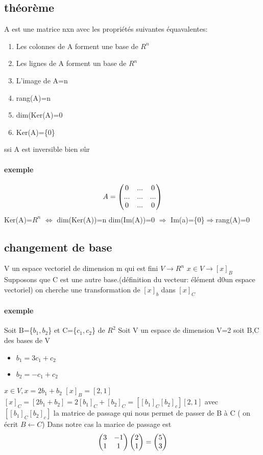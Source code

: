 \documentclass[a4paper,10pt]{article}
\begin{document}
\subsection{théorème}
A est une matrice nxn avec les propriétés suivantes équavalentes:
\begin{enumerate}
 \item Les colonnes de A forment une base de $R^n$
 \item Les lignes de A forment un base de $R^n$
 \item L'image de A=n
 \item rang(A)=n
 \item dim(Ker(A)=0
 \item Ker(A)=\{0\}
\end{enumerate}
ssi A est inversible bien sûr
\paragraph{exemple}
\[
A=
\begin{pmatrix}
 0&...&0\cr
 ...&...&...\cr
 0&...&0\cr
\end{pmatrix}
\]
\newline
Ker(A)=$R^n$ $\Leftrightarrow$ dim(Ker(A))=n
\newline
dim(Im(A))=0 $\Rightarrow$ Im(a)=\{0\}$\Rightarrow$rang(A)=0
\subsection{changement de base}
V un espace vectoriel de dimension m qui est fini
\newline
$V\rightarrow R^n$ $x\in V\rightarrow[x]_B$
\newline
Supposons que C est une autre base.(définition du vecteur: élément d0un espace vectoriel)
\newline
on cherche une transformation de $[x]_b$ dans $[x]_C$
\paragraph{exemple}
Soit B=\{$b_1,b_2$\} et C=\{$c_1,c_2$\} de $R^2$
\newline
Soit V un espace de dimension V=2
\newline
soit B,C des bases de V
\begin{itemize}
 \item $b_1=3c_1+c_2$
 \item $b_2=-c_1+c_2$
\end{itemize}

$x\in V,x=2b_1+b_2$
\newline
$[x]_B=[2,1]$
\newline
$[x]_C=[2b_1+b_2]=2 [b_1]_C+[b_2]_C=[[b_1]_C[b_2]_c][2,1]$ avec $[[b_1]_C[b_2]_c]$ la matrice de passage qui nous permet de passer de B à C ( on écrit $B\leftarrow C$)
\newline
Dans notre cas la marice de passage est\[
\begin{pmatrix}
 3&-1\cr
 1&1\cr
\end{pmatrix}
\begin{pmatrix}
 2\cr
 1\cr
\end{pmatrix}
=
\begin{pmatrix}
 5\cr
 3\cr
\end{pmatrix}
\]
\end{document}
